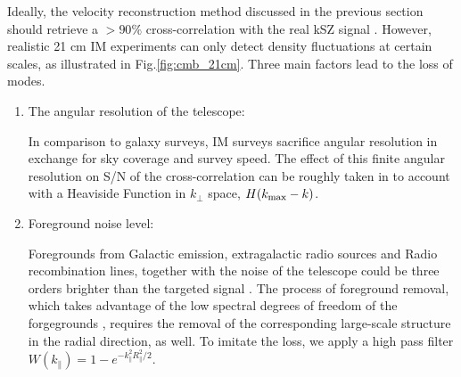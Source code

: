 Ideally, the velocity reconstruction method discussed in the previous section should retrieve a $>90\%$ cross-correlation with the real kSZ signal \cite{Shao11}. However, realistic 21 cm IM experiments can only detect density fluctuations at certain scales, as illustrated in Fig.\ref{fig:cmb_21cm}. Three main factors lead to the loss of modes. 
\begin{enumerate}
\item The angular resolution of the telescope:
 
In comparison to galaxy surveys, IM surveys sacrifice angular resolution in exchange for sky coverage and survey speed. The effect of this finite angular resolution on S/N of the cross-correlation can be roughly taken in to account with a Heaviside Function in $k_\perp$ space, $H(k_\mathrm{max}-k)$.

\item Foreground noise level:

Foregrounds from Galactic emission, extragalactic radio sources and Radio recombination lines, together with the noise of the telescope could be three orders brighter than the targeted signal \cite{DiMatteo04,Masui13}. The process of foreground removal, which takes advantage of the low spectral degrees of freedom of the forgegrounds \cite{Switzer15}, requires the removal of the corresponding large-scale structure in the radial direction, as well. To imitate the loss, we apply a high pass filter $W(k_\parallel)=1-e^{-k_\parallel^2R_\parallel^2/2}$.


\end{enumerate}
